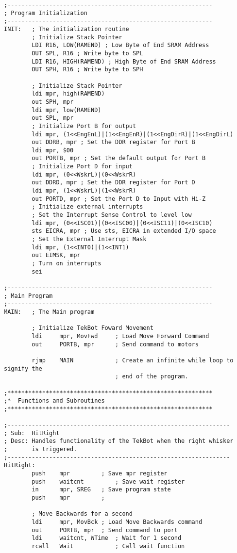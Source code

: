 \documentclass[12pt,letterpaper]{article}
\begin{document}
\begin{verbatim}
;-----------------------------------------------------------
; Program Initialization
;-----------------------------------------------------------
INIT:	; The initialization routine
		; Initialize Stack Pointer
		LDI R16, LOW(RAMEND) ; Low Byte of End SRAM Address
        OUT SPL, R16 ; Write byte to SPL
        LDI R16, HIGH(RAMEND) ; High Byte of End SRAM Address
        OUT SPH, R16 ; Write byte to SPH

		; Initialize Stack Pointer
		ldi mpr, high(RAMEND)
		out SPH, mpr
		ldi mpr, low(RAMEND)
		out SPL, mpr
		; Initialize Port B for output
		ldi mpr, (1<<EngEnL)|(1<<EngEnR)|(1<<EngDirR)|(1<<EngDirL)
		out DDRB, mpr ; Set the DDR register for Port B
		ldi mpr, $00
		out PORTB, mpr ; Set the default output for Port B
		; Initialize Port D for input
		ldi mpr, (0<<WskrL)|(0<<WskrR)
		out DDRD, mpr ; Set the DDR register for Port D
		ldi mpr, (1<<WskrL)|(1<<WskrR)
		out PORTD, mpr ; Set the Port D to Input with Hi-Z
		; Initialize external interrupts
		; Set the Interrupt Sense Control to level low
		ldi mpr, (0<<ISC01)|(0<<ISC00)|(0<<ISC11)|(0<<ISC10)
		sts EICRA, mpr ; Use sts, EICRA in extended I/O space
		; Set the External Interrupt Mask
		ldi mpr, (1<<INT0)|(1<<INT1)
		out EIMSK, mpr
		; Turn on interrupts
		sei

;-----------------------------------------------------------
; Main Program
;-----------------------------------------------------------
MAIN:	; The Main program

		; Initialize TekBot Foward Movement
		ldi		mpr, MovFwd		; Load Move Forward Command
		out		PORTB, mpr		; Send command to motors

		rjmp	MAIN			; Create an infinite while loop to signify the 
								; end of the program.

;***********************************************************
;*	Functions and Subroutines
;***********************************************************

;----------------------------------------------------------------
; Sub:	HitRight
; Desc:	Handles functionality of the TekBot when the right whisker
;		is triggered.
;----------------------------------------------------------------
HitRight:
		push	mpr			; Save mpr register
		push	waitcnt			; Save wait register
		in		mpr, SREG	; Save program state
		push	mpr			;

		; Move Backwards for a second
		ldi		mpr, MovBck	; Load Move Backwards command
		out		PORTB, mpr	; Send command to port
		ldi		waitcnt, WTime	; Wait for 1 second
		rcall	Wait			; Call wait function


\end{verbatim}
\end{document}
